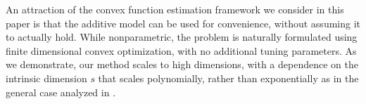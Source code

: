 An attraction of the convex function estimation framework we consider
in this paper is that the additive model can be used for convenience,
without assuming it to actually hold.  While nonparametric, the
problem is naturally formulated using finite dimensional convex
optimization, with no additional tuning parameters.  As we demonstrate,
our method scales to high dimensions, with a dependence on the
intrinsic dimension $s$ that scales polynomially, rather than
exponentially as in the general case analyzed in \cite{dalalyan:12}.



%
%
%
%
%
%
%
%


